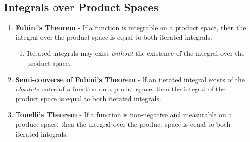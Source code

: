 \documentclass{article}
\begin{document}
    \subsection{Integrals over Product Spaces}
    \begin{enumerate}
        \item
            \textbf{Fubini's Theorem} - If a function is integrable on a product space, then the integral over the product space is equal to both iterated integrals.
            \begin{enumerate}
                \item
                    Iterated integrals may exist \emph{without} the existence of the integral over the product space.
            \end{enumerate}
        \item
            \textbf{Semi-converse of Fubini's Theorem} - If an iterated integral exists of the \emph{absolute value} of a function on a prodct space, then the integral of the product space is equal to both iterated integrals.
        \item
            \textbf{Tonelli's Theorem} - If a function is non-negative and measurable on a product space, then the integral over the product space is equal to both iterated integrals.
    \end{enumerate}
\end{document}
